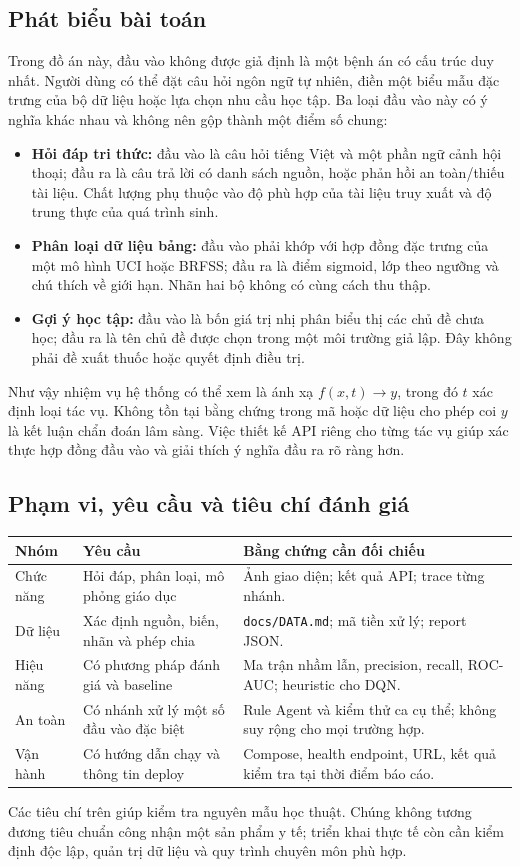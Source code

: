 \subsection{Phát biểu bài toán}
Trong đồ án này, đầu vào không được giả định là một bệnh án có cấu trúc duy nhất. Người dùng có thể đặt câu hỏi ngôn ngữ tự nhiên, điền một biểu mẫu đặc trưng của bộ dữ liệu hoặc lựa chọn nhu cầu học tập. Ba loại đầu vào này có ý nghĩa khác nhau và không nên gộp thành một điểm số chung:
\begin{itemize}
\item \textbf{Hỏi đáp tri thức:} đầu vào là câu hỏi tiếng Việt và một phần ngữ cảnh hội thoại; đầu ra là câu trả lời có danh sách nguồn, hoặc phản hồi an toàn/thiếu tài liệu. Chất lượng phụ thuộc vào độ phù hợp của tài liệu truy xuất và độ trung thực của quá trình sinh.
\item \textbf{Phân loại dữ liệu bảng:} đầu vào phải khớp với hợp đồng đặc trưng của một mô hình UCI hoặc BRFSS; đầu ra là điểm sigmoid, lớp theo ngưỡng và chú thích về giới hạn. Nhãn hai bộ không có cùng cách thu thập.
\item \textbf{Gợi ý học tập:} đầu vào là bốn giá trị nhị phân biểu thị các chủ đề chưa học; đầu ra là tên chủ đề được chọn trong một môi trường giả lập. Đây không phải đề xuất thuốc hoặc quyết định điều trị.
\end{itemize}
\noindent Như vậy nhiệm vụ hệ thống có thể xem là ánh xạ $f(x,t)\rightarrow y$, trong đó $t$ xác định loại tác vụ. Không tồn tại bằng chứng trong mã hoặc dữ liệu cho phép coi $y$ là kết luận chẩn đoán lâm sàng. Việc thiết kế API riêng cho từng tác vụ giúp xác thực hợp đồng đầu vào và giải thích ý nghĩa đầu ra rõ ràng hơn.
\subsection{Phạm vi, yêu cầu và tiêu chí đánh giá}
\begin{longtable}{p{2.7cm}p{5.7cm}p{5.3cm}}\toprule
\textbf{Nhóm} & \textbf{Yêu cầu} & \textbf{Bằng chứng cần đối chiếu}\\\midrule\endhead
Chức năng & Hỏi đáp, phân loại, mô phỏng giáo dục & Ảnh giao diện; kết quả API; trace từng nhánh.\\
Dữ liệu & Xác định nguồn, biến, nhãn và phép chia & \texttt{docs/DATA.md}; mã tiền xử lý; report JSON.\\
Hiệu năng & Có phương pháp đánh giá và baseline & Ma trận nhầm lẫn, precision, recall, ROC-AUC; heuristic cho DQN.\\
An toàn & Có nhánh xử lý một số đầu vào đặc biệt & Rule Agent và kiểm thử ca cụ thể; không suy rộng cho mọi trường hợp.\\
Vận hành & Có hướng dẫn chạy và thông tin deploy & Compose, health endpoint, URL, kết quả kiểm tra tại thời điểm báo cáo.\\\bottomrule\end{longtable}
\noindent Các tiêu chí trên giúp kiểm tra nguyên mẫu học thuật. Chúng không tương đương tiêu chuẩn công nhận một sản phẩm y tế; triển khai thực tế còn cần kiểm định độc lập, quản trị dữ liệu và quy trình chuyên môn phù hợp.
